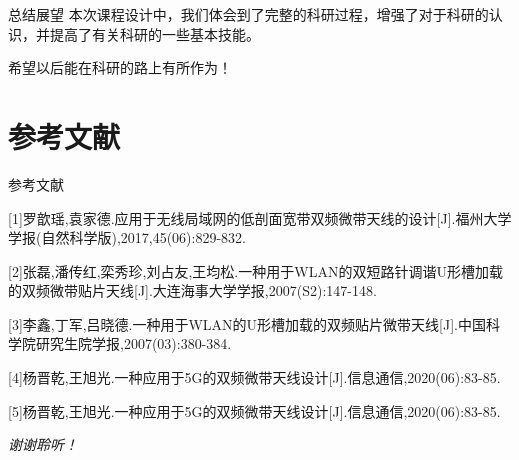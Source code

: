 \documentclass[10pt]{beamer}
\begin{document}
\begin{frame}{总结展望}
	\qquad 本次课程设计中，我们体会到了完整的科研过程，增强了对于科研的认识，并提高了有关科研的一些基本技能。

	\qquad 希望以后能在科研的路上有所作为！
\end{frame}

\section{参考文献}
\begin{frame}{参考文献}

	[1]罗歆瑶,袁家德.应用于无线局域网的低剖面宽带双频微带天线的设计[J].福州大学学报(自然科学版),2017,45(06):829-832.

	[2]张磊,潘传红,栾秀珍,刘占友,王均松.一种用于WLAN的双短路针调谐U形槽加载的双频微带贴片天线[J].大连海事大学学报,2007(S2):147-148.

	[3]李鑫,丁军,吕晓德.一种用于WLAN的U形槽加载的双频贴片微带天线[J].中国科学院研究生院学报,2007(03):380-384.

	[4]杨晋乾,王旭光.一种应用于5G的双频微带天线设计[J].信息通信,2020(06):83-85.

	[5]杨晋乾,王旭光.一种应用于5G的双频微带天线设计[J].信息通信,2020(06):83-85.

\end{frame}

\begin{frame}
\begin{center}
	\Huge \textit{谢谢聆听！}
\end{center}
	
\end{frame}
\end{document}
